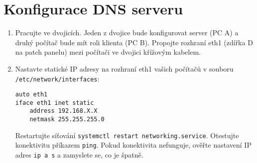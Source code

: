 \section{Konfigurace DNS serveru}
\begin{enumerate}

  \item Pracujte ve dvojicích. Jeden z dvojice bude konfigurovat server (PC A)
    a druhý počítač bude mít roli klienta (PC B). Propojte rozhraní eth1 (zdířka
    D na patch panelu)
    mezi počítači ve dvojici křížovým kabelem.
  \item Nastavte statické IP adresy na rozhraní eth1 vašich počítačů v souboru
    \\
    {\tt /etc/network/interfaces}:
\begin{verbatim}    
auto eth1
iface eth1 inet static
    address 192.168.X.X
    netmask 255.255.255.0
\end{verbatim}    
    Restartujte síťování {\tt systemctl restart networking.service}.
    Otestujte konektivitu příkazem {\tt ping}. Pokud konektivita nefunguje,
    ověřte nastavení IP adres {\tt ip a s} a zamyslete se, co je špatně.


\end{enumerate}
